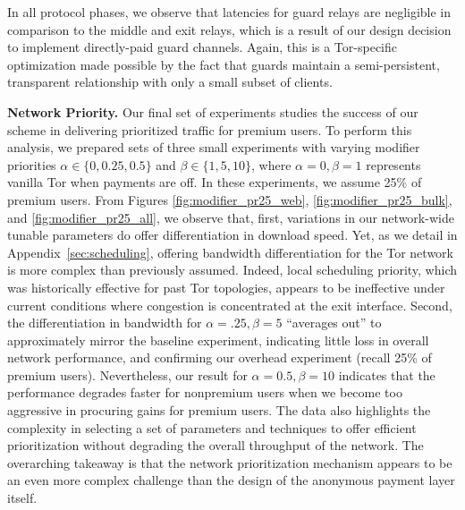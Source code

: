 In all protocol phases, we observe that latencies for guard relays are negligible
in comparison to the middle and exit relays, which is a result of our design
decision to implement directly-paid guard channels. Again, this is a
Tor-specific optimization made possible by the fact that guards maintain a
semi-persistent, transparent relationship with only a small subset of clients.


\medskip
\noindent
\textbf{Network Priority.}
\label{sec:priority_exp}
Our final set of experiments studies the success of our scheme in delivering
prioritized traffic for premium users. To perform this analysis, we prepared
sets of three small experiments with varying modifier priorities $\alpha \in
\{0, 0.25, 0.5\}$ and $\beta \in \{1, 5, 10\}$, where $\alpha = 0, \beta = 1$
represents vanilla Tor when payments are off. In these experiments, we assume
25\% of premium users. From Figures \ref{fig:modifier_pr25_web},
\ref{fig:modifier_pr25_bulk}, and \ref{fig:modifier_pr25_all}, we
observe that,
first, variations in our network-wide tunable
parameters do offer differentiation in download speed. Yet, as we detail in
Appendix~\ref{sec:scheduling}, offering bandwidth differentiation for the Tor
network is more complex than previously assumed. Indeed, local scheduling
priority, which was historically effective for past Tor topologies, appears to
be ineffective under current conditions where congestion is concentrated at
the exit interface. Second, the differentiation in bandwidth for $\alpha = .25,
\beta=5$ ``averages out'' to approximately mirror the baseline experiment,
indicating little loss in overall network performance, and confirming our
overhead experiment (recall 25\% of premium users). Nevertheless, our result for
$\alpha = 0.5, \beta=10$ indicates that the performance degrades faster for
nonpremium users when we become too aggressive in procuring gains for
premium users. The data also highlights the complexity in selecting a set of
parameters and techniques to offer efficient prioritization without degrading
the overall throughput of the network. The overarching takeaway is that the
network prioritization mechanism appears to be an even more complex challenge
than the design of the anonymous payment layer itself.


